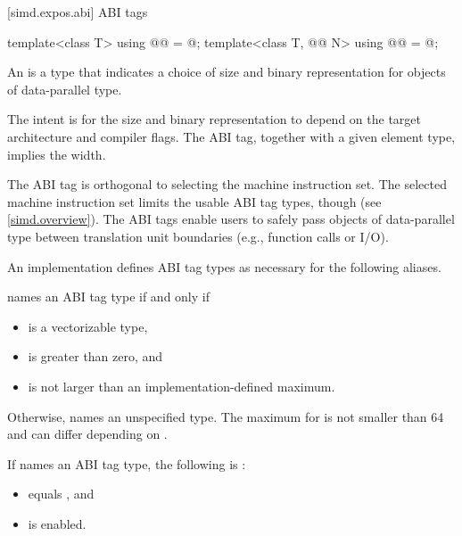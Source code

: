 [simd.expos.abi]{ ABI tags}

\begin{itemdecl}
template<class T> using @@ = @\seebelow@;
template<class T, @@ N> using @@ = @\seebelow@;
\end{itemdecl}

\begin{itemdescr}
\pnum
An  is a type that indicates a choice of size and binary
representation for objects of data-parallel type.
\begin{note}
The intent is for the size and binary representation to depend on the target
architecture and compiler flags.
The ABI tag, together with a given element type, implies the width.
\end{note}

\pnum
\begin{note}
The ABI tag is orthogonal to selecting the machine instruction set.
The selected machine instruction set limits the usable ABI tag types, though
(see \ref{simd.overview}).
The ABI tags enable users to safely pass objects of data-parallel type between
translation unit boundaries (e.g., function calls or I/O).
\end{note}

\pnum
An implementation defines ABI tag types as necessary for the following aliases.

\pnum
{} names an ABI tag type if and only if
\begin{itemize}
\item {} is a vectorizable type,
\item {} is greater than zero, and
\item {} is not larger than an implementation-defined maximum.
\end{itemize}
Otherwise,  names an unspecified type.
The  maximum for
 is not smaller than 64 and can differ depending on .

\pnum
If  names an ABI tag type,
the following is :
\begin{itemize}
\item
  equals , and
\item
  is enabled.
\end{itemize}


\end{itemdescr}

